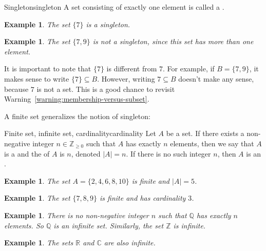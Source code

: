 \documentclass{book}
\newcounter{ekcounter}%
\theoremstyle{ekimcustom}
\newtheorem{example}[ekcounter]{Example}
\newcommand\defn[1]{{\color{blue}{\bf #1}}}
\begin{document}
\begin{bdefinition}{Singleton}{singleton}
A set consisting of exactly one element is called a \defn{singleton}.
\end{bdefinition}
\begin{example}
The set $\{7\}$ is a singleton. 
\end{example}
\begin{example}
The set $\{7,9\}$ is not a singleton, since this set has more than one element.
\end{example}
It is important to note that $\{7\}$ is different from $7$. For example, if $B = \{7,9\}$, it makes sense to write $\{7\} \subseteq B$. However, writing $7 \subseteq B$ doesn't make any sense, because $7$ is not a set. This is a good chance to revisit Warning~\ref{warning:membership-versus-subset}.

A finite set generalizes the notion of singleton:
\begin{bdefinition}{Finite set, infinite set, cardinality}{cardinality}
Let $A$ be a set. If there exists a non-negative integer $n \in \mathbb{Z}_{\geq 0}$ such that $A$ has exactly $n$ elements, then we say that $A$ is a \defn{finite set} and the \defn{cardinality} of $A$ is $n$, denoted $|A|=n$. If there is no such integer $n$, then $A$ is an \defn{infinite set}.
\end{bdefinition}
\begin{example}
The set $A=\{2,4,6,8,10\}$ is finite and $|A|=5$.
\end{example}
\begin{example}
The set $\{7,8,9\}$ is finite and has cardinality $3$.
\end{example}
\begin{example}
There is no non-negative integer $n$ such that $\mathbb{Q}$ has exactly $n$ elements. So $\mathbb{Q}$ is an infinite set. Similarly, the set $\mathbb{Z}$ is infinite.
\end{example}
\begin{example}
The sets $\mathbb{R}$ and $\mathbb{C}$ are also infinite.
\end{example}
\end{document}
